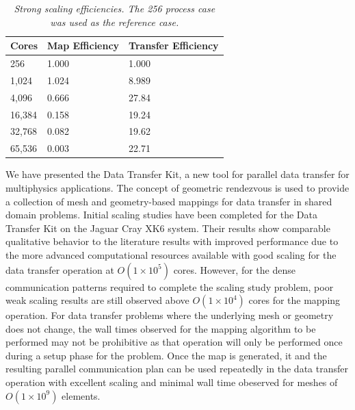 \documentclass{mc2013}
\begin{document}
\begin{table}[htpb!]
  \begin{center}
    \begin{tabular}{lll}\hline\hline
      \multicolumn{1}{c}{Cores}& 
      \multicolumn{1}{c}{Map Efficiency} & 
      \multicolumn{1}{c}{Transfer Efficiency}\\\hline\hline
      256 &	1.000 &	1.000 \\
      1,024 &	1.024 &	8.989 \\
      4,096 &	0.666 &	27.84 \\
      16,384 &	0.158 &	19.24 \\
      32,768 &	0.082 &	19.62 \\
      65,536 &	0.003 &	22.71 \\
      \hline\hline
    \end{tabular}
  \end{center}
  \caption{\sl Strong scaling efficiencies. The 256 process case was used
    as the reference case.}
  \label{tab:strong_efficiency}
\end{table}


We have presented the Data Transfer Kit, a new tool for parallel data
transfer for multiphysics applications. The concept of geometric
rendezvous is used to provide a collection of mesh and geometry-based
mappings for data transfer in shared domain problems. Initial scaling
studies have been completed for the Data Transfer Kit on the Jaguar
Cray XK6 system. Their results show comparable qualitative behavior to
the literature results with improved performance due to the more
advanced computational resources available with good scaling for the
data transfer operation at $O(1 \times 10^5)$ cores. However, for the
dense communication patterns required to complete the scaling study
problem, poor weak scaling results are still observed above $O(1
\times 10^4)$ cores for the mapping operation. For data transfer
problems where the underlying mesh or geometry does not change, the
wall times observed for the mapping algorithm to be performed may not
be prohibitive as that operation will only be performed once during a
setup phase for the problem. Once the map is generated, it and the
resulting parallel communication plan can be used repeatedly in the
data transfer operation with excellent scaling and minimal wall time
obeserved for meshes of $O(1 \times 10^9)$ elements.
\end{document}
